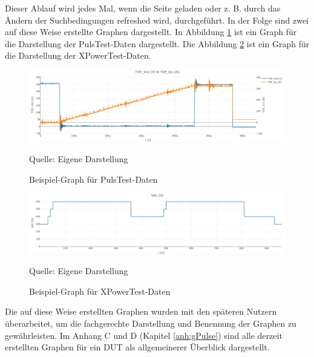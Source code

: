 Dieser Ablauf wird jedes Mal, wenn die Seite geladen oder z. B. durch das Ändern der Suchbedingungen refreshed wird, durchgeführt.
In der Folge sind zwei auf diese Weise erstellte Graphen dargestellt.
In Abbildung \ref{fig:Beispiel-Graph für PulsTest-Daten} ist ein Graph für die Darstellung der PulsTest-Daten dargestellt.
Die Abbildung \ref{fig:Beispiel-Graph für XPowerTest-Daten} ist ein Graph für die Darstellung der XPowerTest-Daten.

\begin{figure}[H]
    \centering
    \includegraphics[width=1\textwidth]{Grafiken/newplot.png}
    \caption{Beispiel-Graph für PulsTest-Daten}
    \label{fig:Beispiel-Graph für PulsTest-Daten}
    {Quelle: Eigene Darstellung}
\end{figure}

\begin{figure}[H]
    \centering
    \includegraphics[width=1\textwidth]{Grafiken/newplot (1).png}
    \caption{Beispiel-Graph für XPowerTest-Daten}
    \label{fig:Beispiel-Graph für XPowerTest-Daten}
    {Quelle: Eigene Darstellung}
\end{figure}

Die auf diese Weise erstellten Graphen wurden mit den späteren Nutzern überarbeitet, um die fachgerechte Darstellung und Benennung der Graphen zu gewährleisten.
Im Anhang C und D (Kapitel \ref{anh:gPulse}) sind alle derzeit erstellten Graphen für ein \ac{DUT} als allgemeinerer Überblick dargestellt.
